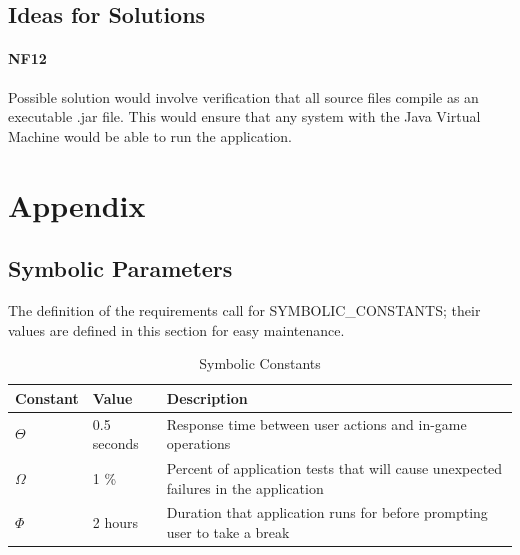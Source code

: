 \documentclass[12pt, titlepage]{article}
\begin{document}
\subsection{Ideas for Solutions}
\paragraph{NF12}
Possible solution would involve verification that all source files compile as an executable .jar file. This would ensure that any system with the Java Virtual Machine would be able to run the application.

\newpage





\newpage

\section{Appendix}

\subsection{Symbolic Parameters}

The definition of the requirements call for SYMBOLIC\_CONSTANTS; their values are defined in this section for easy maintenance.

\begin{table}[H]
\caption{Symbolic Constants} \label{tab:constants}
\begin{tabularx}{\textwidth}{p{3cm}p{2cm}X}
\toprule {\bf Constant} & {\bf Value} & {\bf Description}\\
\midrule
$\Theta$ & 0.5 seconds & Response time between user actions and in-game operations\\
$\Omega$ & 1 \% & Percent of application tests that will cause unexpected failures in the application\\
$\Phi$ & 2 hours & Duration that application runs for before prompting user to take a break\\
\bottomrule
\end{tabularx}
\end{table}
\end{document}
